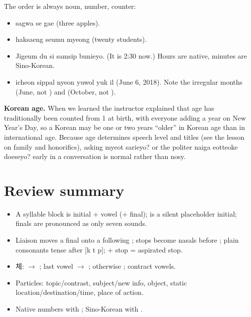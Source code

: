 \begin{example}[Counting]
The order is always noun, number, counter:
\begin{itemize}
  \item {} sagwa se gae (three apples).
  \item {} haksaeng seumu myeong (twenty students).
  \item {} Jigeum du si samsip bunieyo. (It is 2:30 now.) Hours
        are native, minutes are Sino-Korean.
  \item {} icheon sippal nyeon yuwol yuk il (June 6, 2018).
        Note the irregular months  (June, not ) and  (October,
        not ).
\end{itemize}
\end{example}

\begin{aside}
\textbf{Korean age.} When we learned  the instructor explained that age has
traditionally been counted from 1 at birth, with everyone adding a year on New Year's Day,
so a Korean may be one or two years ``older'' in Korean age than in international age.
Because age determines speech level and titles (see the lesson on family and honorifics), asking
 myeot sarieyo? or the politer  naiga eotteoke
doeseyo? early in a conversation is normal rather than nosy.
\end{aside}

\section*{Review summary}
\begin{itemize}
  \item A syllable block is initial + vowel (+ final);  is a silent placeholder
        initial; finals are pronounced as only seven sounds.
  \item Liaison moves a final onto a following ; stops become nasals before
        ; plain consonants tense after [k t p];  + stop = aspirated stop.
  \item {}체:  $\to$ ; last vowel  $\to$
        ; otherwise ; contract vowels.
  \item Particles:  topic/contrast,  subject/new info, 
        object,  static location/destination/time,  place of action.
  \item Native numbers with ; Sino-Korean with .
\end{itemize}
